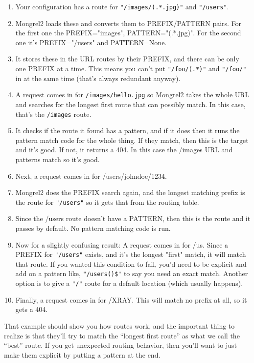 \begin{enumerate}
\item Your configuration has a route for \verb|"/images/(.*.jpg)"| and \verb|"/users"|.
\item Mongrel2 loads these and converts them to PREFIX/PATTERN pairs.  For the first one
    the PREFIX="images", PATTERN="(.*.jpg)".  For the second one it's PREFIX="/users" and
    PATTERN=None.
\item It stores these in the URL routes by their PREFIX, and there can be only one
    PREFIX at a time.  This means you can't put \verb|"/foo/(.*)"| and \verb|"/foo/"|
    in at the same time (that's always redundant anyway).
\item A request comes in for \verb|/images/hello.jpg| so Mongrel2 takes the whole URL
    and searches for the longest first route that can possibly match.  In this case, that's
    the \verb|/images| route.
\item It checks if the route it found has a pattern, and if it does then it runs the
    pattern match code for the whole thing.  If they match, then this is the target
    and it's good.  If not, it returns a 404.  In this case the /images URL and patterns
    match so it's good.
\item Next, a request comes in for /users/johndoe/1234.
\item Mongrel2 does the PREFIX search again, and the longest matching prefix is the
    route for \verb|"/users"| so it gets that from the routing table.
\item Since the /users route doesn't have a PATTERN, then this is the route and it passes
    by default. No pattern matching code is run.
\item Now for a slightly confusing result:  A request comes in for /us.  Since a PREFIX
    for \verb|"/users"| exists, and it's the longest "first" match, it will match that
    route.  If you wanted this condition to fail, you'd need to be explicit and add on a
    pattern like, \verb|"/users()$"| to say you need an exact match. Another option is
    to give a \verb|"/"| route for a default location (which usually happens).
\item Finally, a request comes in for /XRAY.  This will match no prefix at all, so it
    gets a 404.
\end{enumerate}

That example should show you how routes work, and the important thing to realize
is that they'll try to match the ``longest first route'' as what we call the ``best''
route.  If you get unexpected routing behavior, then you'll want to just make them
explicit by putting a pattern at the end.

